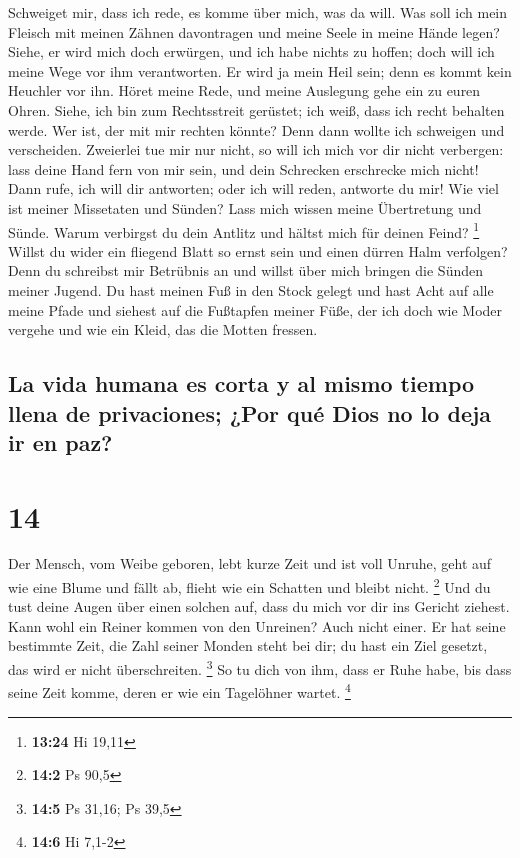  Schweiget mir, dass ich rede, es komme über mich, was da
will.  Was soll ich mein Fleisch mit meinen Zähnen
davontragen und meine Seele in meine Hände legen?  Siehe,
er wird mich doch erwürgen, und ich habe nichts zu hoffen; doch will ich
meine Wege vor ihm verantworten.  Er wird ja mein Heil
sein; denn es kommt kein Heuchler vor ihn.  Höret meine
Rede, und meine Auslegung gehe ein zu euren Ohren. 
Siehe, ich bin zum Rechtsstreit gerüstet; ich weiß, dass ich recht
behalten werde.  Wer ist, der mit mir rechten könnte?
Denn dann wollte ich schweigen und verscheiden. 
Zweierlei tue mir nur nicht, so will ich mich vor dir nicht verbergen:
 lass deine Hand fern von mir sein, und dein Schrecken
erschrecke mich nicht!  Dann rufe, ich will dir
antworten; oder ich will reden, antworte du mir!  Wie
viel ist meiner Missetaten und Sünden? Lass mich wissen meine
Übertretung und Sünde.  Warum verbirgst du dein Antlitz
und hältst mich für deinen Feind? \footnote{\textbf{13:24} Hi 19,11}
 Willst du wider ein fliegend Blatt so ernst sein und
einen dürren Halm verfolgen?  Denn du schreibst mir
Betrübnis an und willst über mich bringen die Sünden meiner Jugend.
 Du hast meinen Fuß in den Stock gelegt und hast Acht auf
alle meine Pfade und siehest auf die Fußtapfen meiner Füße,
 der ich doch wie Moder vergehe und wie ein Kleid, das
die Motten fressen.

\hypertarget{la-vida-humana-es-corta-y-al-mismo-tiempo-llena-de-privaciones-por-quuxe9-dios-no-lo-deja-ir-en-paz}{%
\subsection{La vida humana es corta y al mismo tiempo llena de
privaciones; ¿Por qué Dios no lo deja ir en
paz?}\label{la-vida-humana-es-corta-y-al-mismo-tiempo-llena-de-privaciones-por-quuxe9-dios-no-lo-deja-ir-en-paz}}

\hypertarget{section-13}{%
\section{14}\label{section-13}}

 Der Mensch, vom Weibe geboren, lebt kurze Zeit und ist
voll Unruhe,  geht auf wie eine Blume und fällt ab, flieht
wie ein Schatten und bleibt nicht. \footnote{\textbf{14:2} Ps 90,5}
 Und du tust deine Augen über einen solchen auf, dass du
mich vor dir ins Gericht ziehest.  Kann wohl ein Reiner
kommen von den Unreinen? Auch nicht einer.  Er hat seine
bestimmte Zeit, die Zahl seiner Monden steht bei dir; du hast ein Ziel
gesetzt, das wird er nicht überschreiten. \footnote{\textbf{14:5} Ps
  31,16; Ps 39,5}  So tu dich von ihm, dass er Ruhe habe,
bis dass seine Zeit komme, deren er wie ein Tagelöhner wartet.
\footnote{\textbf{14:6} Hi 7,1-2}

